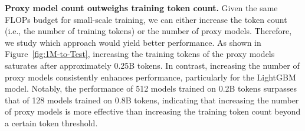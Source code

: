 \textbf{Proxy model count outweighs training token count.}\;\;
Given the same FLOPs budget for small-scale training, we can either increase the token count (i.e., the number of training tokens) or the number of proxy models. Therefore, we study which approach would yield better performance.
As shown in Figure~\ref{fig:1M-to-Test}, increasing the training tokens of the proxy models saturates after approximately 0.25B tokens.
In contrast, increasing the number of proxy models consistently enhances performance, particularly for the LightGBM model.
Notably, the performance of 512 models trained on 0.2B tokens surpasses that of 128 models trained on 0.8B tokens, indicating that increasing the number of proxy models is more effective than increasing the training token count beyond a certain token threshold. 
